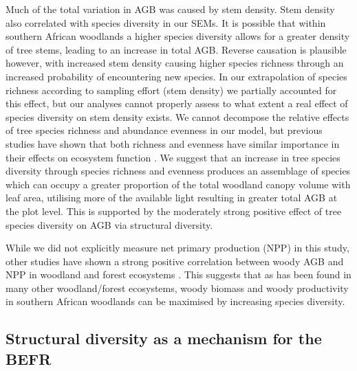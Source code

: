\documentclass[11pt,a4paper]{article}
\begin{document}
Much of the total variation in AGB was caused by stem density. Stem density also correlated with species diversity in our SEMs. It is possible that within southern African woodlands a higher species diversity allows for a greater density of tree stems, leading to an increase in total AGB. Reverse causation is plausible however, with increased stem density causing higher species richness through an increased probability of encountering new species. In our extrapolation of species richness according to sampling effort (stem density) we partially accounted for this effect, but our analyses cannot properly assess to what extent a real effect of species diversity on stem density exists. We cannot decompose the relative effects of tree species richness and abundance evenness in our model, but previous studies have shown that both richness and evenness have similar importance in their effects on ecosystem function \citep{Valery2009, Zhang2012}. We suggest that an increase in tree species diversity through species richness and evenness produces an assemblage of species which can occupy a greater proportion of the total woodland canopy volume with leaf area, utilising more of the available light resulting in greater total AGB at the plot level. This is supported by the moderately strong positive effect of tree species diversity on AGB via structural diversity.



While we did not explicitly measure net primary production (NPP) in this study, other studies have shown a strong positive correlation between woody AGB and NPP in woodland and forest ecosystems \citep{Chisholm2013, Prado-Junior2016}. This suggests that as has been found in many other woodland/forest ecosystems, woody biomass and woody productivity in southern African woodlands can be maximised by increasing species diversity. 

\subsection{Structural diversity as a mechanism for the BEFR}
\end{document}
